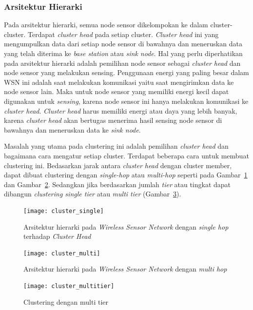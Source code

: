 \subsubsection{Arsitektur Hierarki}
Pada arsitektur hierarki, semua node sensor dikelompokan ke dalam cluster-cluster. Terdapat \textit{cluster head} pada setiap cluster. \textit{Cluster head} ini yang mengumpulkan data dari setiap node sensor di bawahnya dan meneruskan data yang telah diterima ke \textit{base station} atau \textit{sink node}. Hal yang perlu diperhatikan pada arsitektur hierarki adalah pemilihan node sensor sebagai \textit{cluster head} dan node sensor yang melakukan sensing. Penggunaan energi yang paling besar dalam WSN ini adalah saat melakukan komunikasi yaitu saat mengirimkan data ke node sensor lain. Maka untuk node sensor yang memiliki energi kecil dapat digunakan untuk \textit{sensing}, karena node sensor ini hanya melakukan komunikasi ke \textit{cluster head}. \textit{Cluster head} harus memiliki energi atau daya yang lebih banyak, karena \textit{cluster head} akan bertugas menerima hasil sensing node sensor di bawahnya dan meneruskan data ke \textit{sink node}. 

Masalah yang utama pada clustering ini adalah pemilihan \textit{cluster head} dan bagaimana cara mengatur setiap cluster. Terdapat beberapa cara untuk membuat clustering ini. Bedasarkan jarak antara \textit{cluster head} dengan cluster member, dapat dibuat clustering dengan \textit{single-hop} atau \textit{multi-hop} seperti pada Gambar~\ref{fig:cluster_single} dan Gambar~\ref{fig:cluster_multi}. Sedangkan jika berdasarkan jumlah \textit{tier} atau tingkat dapat dibangun \textit{clustering single tier} atau \textit{multi tier} (Gambar~\ref{fig:cluster_multitier}).
\begin{figure} [H]
	\centering  
	\texttt{[image: cluster\_single]}  
	\caption[Arsitektur hierarki pada \textit{Wireless Sensor Network} dengan \textit{single hop} terhadap \textit{Cluster Head}]{Arsitektur hierarki pada \textit{Wireless Sensor Network} dengan \textit{single hop} terhadap \textit{Cluster Head}} 
	\label{fig:cluster_single} 
\end{figure} 
\begin{figure} [H]
	\centering  
	\texttt{[image: cluster\_multi]}  
	\caption[Arsitektur hierarki pada \textit{Wireless Sensor Network} dengan \textit{multi hop}]{Arsitektur hierarki pada \textit{Wireless Sensor Network} dengan \textit{multi hop}} 
	\label{fig:cluster_multi} 
\end{figure} 
\begin{figure} [H]
	\centering  
	\texttt{[image: cluster\_multitier]}  
	\caption[Clsutering dengan multi tier]{Clustering dengan multi tier} 
	\label{fig:cluster_multitier} 
\end{figure}

